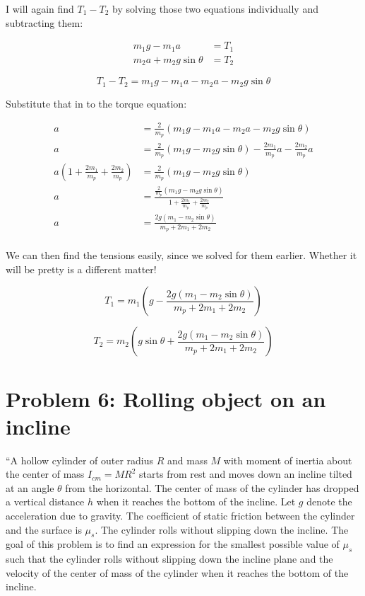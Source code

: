 \documentclass[8.01x]{subfiles}
\begin{document}
I will again find $T_1 - T_2$ by solving those two equations individually and subtracting them:

\begin{align}
m_1 g - m_1 a &= T_1\\
m_2 a + m_2 g \sin \theta &= T_2
\end{align}

\begin{equation}
T_1 - T_2 = m_1 g - m_1 a - m_2 a - m_2 g \sin \theta
\end{equation}

Substitute that in to the torque equation:

\begin{align}
a &= \frac{2}{m_p} \left(m_1 g - m_1 a - m_2 a - m_2 g \sin \theta \right)\\
a &= \frac{2}{m_p} \left(m_1 g - m_2 g \sin \theta \right) - \frac{2 m_1}{m_p} a - \frac{2 m_2}{m_p} a\\
a \left(1 + \frac{2 m_1}{m_p} + \frac{2 m_2}{m_p}\right) &= \frac{2}{m_p} \left( m_1 g - m_2 g \sin \theta \right)\\
a &= \frac{\frac{2}{m_p} \left(m_1 g - m_2 g \sin \theta \right)}{1 + \frac{2 m_1}{m_p} + \frac{2 m_2}{m_p}}\\
a &= \frac{2 g \left(m_1 - m_2 \sin \theta \right)}{m_p + 2 m_1 + 2 m_2}\\
\end{align}

We can then find the tensions easily, since we solved for them earlier. Whether it will be pretty is a different matter!

\begin{equation}
T_1 = m_1 \left( g - \frac{2 g \left(m_1 - m_2 \sin \theta \right)}{m_p + 2 m_1 + 2 m_2} \right)
\end{equation}

\begin{equation}
T_2 = m_2 \left(g \sin \theta + \frac{2 g \left(m_1 - m_2 \sin \theta \right)}{m_p + 2 m_1 + 2 m_2} \right)
\end{equation}

\section{Problem 6: Rolling object on an incline}

``A hollow cylinder of outer radius $R$ and mass $M$ with moment of inertia about the center of mass $I_{cm} = M R^2$ starts from rest and moves down an incline tilted at an angle $\theta$ from the horizontal. The center of mass of the cylinder has dropped a vertical distance $h$ when it reaches the bottom of the incline. Let $g$ denote the acceleration due to gravity. The coefficient of static friction between the cylinder and the surface is $\mu_s$. The cylinder rolls without slipping down the incline. The goal of this problem is to find an expression for the smallest possible value of $\mu_s$ such that the cylinder rolls without slipping down the incline plane and the velocity of the center of mass of the cylinder when it reaches the bottom of the incline.
\end{document}
